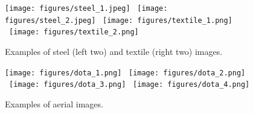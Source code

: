 \documentclass{article}
\begin{document}
\begin{figure*}[h]
\centering
\texttt{[image: figures/steel\_1.jpeg]}
~\texttt{[image: figures/steel\_2.jpeg]}
~\texttt{[image: figures/textile\_1.png]}
~\texttt{[image: figures/textile\_2.png]}
\caption{
Examples of steel (left two) and textile (right two) images.
}\label{fig:texture}
\vspace{0.2in}
\texttt{[image: figures/dota\_1.png]}
~\texttt{[image: figures/dota\_2.png]}
~\texttt{[image: figures/dota\_3.png]}
~\texttt{[image: figures/dota\_4.png]}
\caption{
Examples of aerial images.
}\label{fig:aerial}
\end{figure*} 
 
\end{document}
